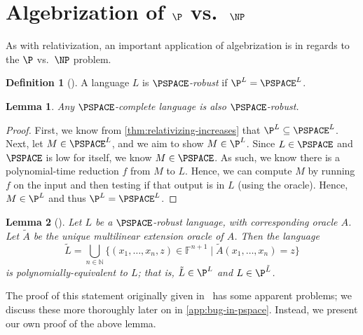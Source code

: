 \documentclass[english]{reedthesis}
\theoremstyle{plain}
\newtheorem{lemma}[lemma]{Lemma}
\theoremstyle{definition}
\newtheorem{defn}[defn]{Definition}
\theoremstyle{remark}
\begin{document}

\section{Algebrization of $\P$ vs.\ $\NP$}\label{sec:alg-p-np}

As with relativization, an important application of algebrization is in regards
to the $\P$ vs.\ $\NP$ problem.

\begin{defn}[{\cite[Def.\ 6.1]{BFL90}}]\label{def:pspace-robust}
  A language $L$ is \emph{$\PSPACE$-robust} if $\P^{L} = \PSPACE^{L}$.
\end{defn}

\begin{lemma}\label{lem:complete-is-robust}
  Any $\PSPACE$-complete language is also $\PSPACE$-robust.
\end{lemma}

\begin{proof}
  First, we know from \cref{thm:relativizing-increases} that
  $\P^{L} \subseteq \PSPACE^{L}$. Next, let $M \in \PSPACE^{L}$, and we aim to show
  $M \in \P^{L}$. Since $L \in \PSPACE$ and $\PSPACE$ is low for itself, we know
  $M \in \PSPACE$. As such, we know there is a polynomial-time reduction $f$ from
  $M$ to $L$. Hence, we can compute $M$ by running $f$ on the input and then
  testing if that output is in $L$ (using the oracle). Hence, $M \in \P^{L}$ and
  thus $\P^{L} = \PSPACE^{L}$.
\end{proof}

\begin{lemma}[{\cite[Lemma 6.2]{BFL90}}]\label{lem:multilinear-is-pspace}
  Let $L$ be a $\PSPACE$-robust language, with corresponding oracle $A$. Let
  $\tilde{A}$ be the unique multilinear extension oracle of $A$. Then the
  language
  \begin{equation}
    \tilde{L} = \bigcup_{n \in \mathbb{N}}\{(x_{1}, \ldots, x_{n}, z) \in \mathbb{F}^{n+1} \mid \tilde{A}(x_{1}, \ldots, x_{n}) = z\}
  \end{equation}
  is polynomially-equivalent to $L$; that is, $\tilde{L} \in \P^{L}$ and
  $L \in \P^{\tilde{L}}$.
\end{lemma}

The proof of this statement originally given in~\cite{BFL90} has some apparent
problems; we discuss these more thoroughly later on in \cref{app:bug-in-pspace}.
Instead, we present our own proof of the above lemma.
\end{document}
